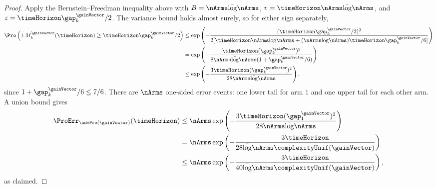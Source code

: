 \begin{proof}
Apply the Bernstein--Freedman inequality above with
$B=\nArms\bar\log\nArms$, $v=\timeHorizon\nArms\bar\log\nArms$,
and $z=\timeHorizon\gap_k^{\gainVector}/2$.
The variance bound holds almost surely, so for either sign separately,
\begin{align*}
\Pro\left(\pm M_k^{\gainVector}(\timeHorizon)
\geq\timeHorizon\gap_k^{\gainVector}/2\right)
&\leq\exp\left(
-\frac{(\timeHorizon\gap_k^{\gainVector}/2)^2}
{2[\timeHorizon\nArms\bar\log\nArms
+(\nArms\bar\log\nArms)\timeHorizon\gap_k^{\gainVector}/6]}\right)\\
&=\exp\left(-\frac{\timeHorizon(\gap_k^{\gainVector})^2}
{8\nArms\bar\log\nArms(1+\gap_k^{\gainVector}/6)}\right)\\
&\leq\exp\left(-\frac{3\timeHorizon(\gap_k^{\gainVector})^2}
{28\nArms\bar\log\nArms}\right),
\end{align*}
since $1+\gap_k^{\gainVector}/6\leq7/6$.
There are $\nArms$ one-sided error events: one lower tail for arm $1$
and one upper tail for each other arm. A union bound gives
\begin{align*}
\ProErr_{\advPro(\gainVector)}(\timeHorizon)
&\leq\nArms\exp\left(-\frac{3\timeHorizon(\gap_1^{\gainVector})^2}
{28\nArms\bar\log\nArms}\right)\\
&=\nArms\exp\left(-\frac{3\timeHorizon}
{28\bar\log\nArms\complexityUnif(\gainVector)}\right)\\
&\leq\nArms\exp\left(-\frac{3\timeHorizon}
{40\bar\log\nArms\complexityUnif(\gainVector)}\right),
\end{align*}
as claimed.
\end{proof}
%
